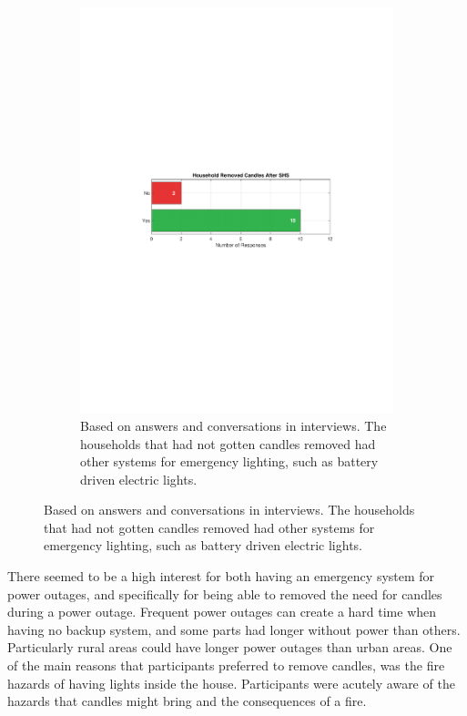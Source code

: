 \begin{figure}[H]
\begin{subfigure}[t]{0.48\textwidth}
        \label{res:soc:poweroutages}
    \end{subfigure}
    \hfill
    \begin{subfigure}[t]{0.48\textwidth}
        \centering
        \includegraphics[width=\textwidth]{photos/RemovedCandles.pdf}
        \caption{Based on answers and conversations in interviews. The households that had not gotten candles removed had other systems for emergency lighting, such as battery driven electric lights.}
        \label{res:soc:removedcandles}
    \end{subfigure}
\end{figure}
There seemed to be a high interest for both having an emergency system for power outages, and specifically for being able to removed the need for candles during a power outage. Frequent power outages can create a hard time when having no backup system, and some parts had longer without power than others. Particularly rural areas could have longer power outages than urban areas. One of the main reasons that participants preferred to remove candles, was the fire hazards of having lights inside the house. Participants were acutely aware of the hazards that candles might bring and the consequences of a fire.


